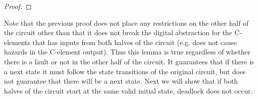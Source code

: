 \documentclass[12pt]{report}
\begin{document}
\begin{proof}

\end{proof}

Note that the previous proof does not place any restrictions on the other half of the circuit other than that it does not break the digital abstraction for the C-elements that has inputs from both halves of the circuit (e.g. does not cause hazards in the C-element output).  Thus this lemma is true regardless of whether there is a fault or not in the other half of the circuit.  It guarantees that if there is a next state it must follow the state transitions of the original circuit, but does not guarantee that there will be a next state.  Next we will show that if both halves of the circuit start at the same valid initial state, deadlock does not occur.
\end{document}
